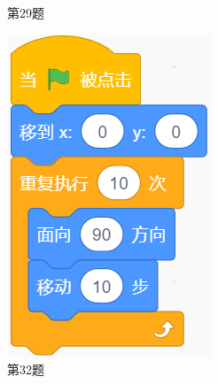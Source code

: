 \documentclass[10pt, a4paper]{article}
\begin{document}
\begin{enumerate}
\begin{figure}[htbp]
\begin{minipage}[t]{.12\textwidth}
                \caption*{第29题}
            \end{minipage}
            \begin{minipage}[t]{.11\textwidth}
                \centering
                \includegraphics[width=\textwidth]{32.png}
                \caption*{第32题}
            \end{minipage}
            \begin{minipage}[t]{.14\textwidth}
                \centering

\end{minipage}
\end{figure}
\end{enumerate}
\end{document}
